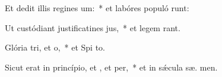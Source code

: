 \item Et dedit illis regines um:~* et labóres populó runt:
\item Ut custódiant justificatines jus,~* et legem  rant.
\item Glória tri, et o,~* et Spi to.
\item Sicut erat in princípio, et , et per,~* et in sǽcula sæ. men.
